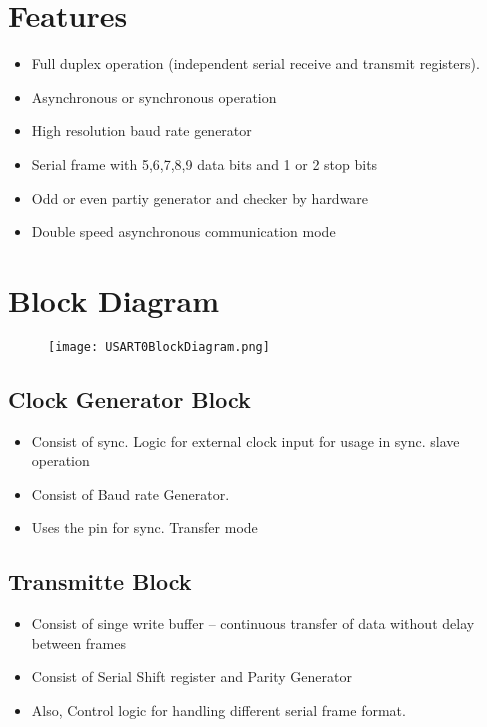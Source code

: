 \documentclass{article}
\begin{document}

\section{Features}
\begin{itemize}
    \item Full duplex operation (independent serial receive and transmit registers).
    \item Asynchronous or synchronous operation
    \item High resolution baud rate generator
    \item Serial frame with 5,6,7,8,9 data bits and 1 or 2 stop bits
    \item Odd or even partiy generator and checker by hardware
    \item Double speed asynchronous communication mode
\end{itemize}
\section{Block Diagram}
\begin{figure}[H]
    \centering
    \texttt{[image: USART0BlockDiagram.png]}
\end{figure}

\subsection{Clock Generator Block}
\begin{itemize}
    \item Consist of sync. Logic for external clock input for usage in sync. slave operation 
    \item Consist of Baud rate Generator.
    \item Uses the  pin for sync. Transfer mode
\end{itemize}

\subsection{Transmitte Block}
\begin{itemize}
    \item Consist of singe write buffer – continuous transfer of data without delay between frames
    \item Consist of Serial Shift register and Parity Generator
    \item Also, Control logic for handling different serial frame format.
\end{itemize}
\end{document}
